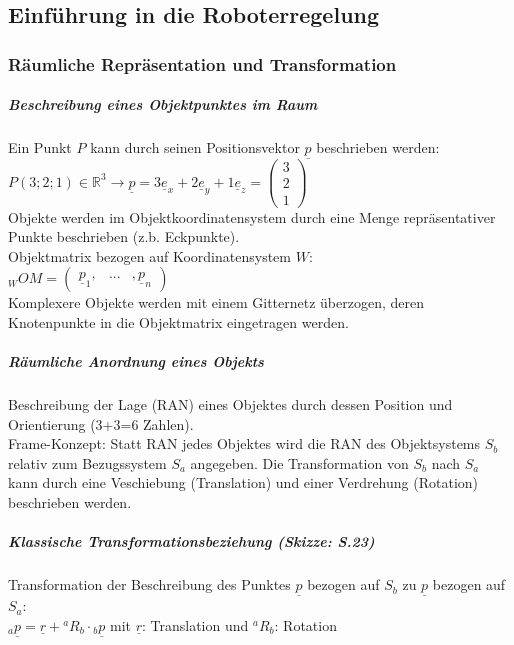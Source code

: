 \documentclass[a4paper,landscape,6pt]{article}
\newcommand{\vect}[1]{\ensuremath{\begin{pmatrix} #1 \end{pmatrix}}}			%
\newcommand{\ul}[1]{\underline{#1}}
\begin{document}
\begin{multicols}{3}
	

\part*{Einführung in die Roboterregelung}
\section{Räumliche Repräsentation und Transformation}
\subsubsection*{Beschreibung eines Objektpunktes im Raum}
Ein Punkt $P$ kann durch seinen Positionsvektor $\ul p$ beschrieben werden:\\
$P(3;2;1) \in \mathbb R^3 \rightarrow \ul p = 3 \ul e_x + 2 \ul e_y + 1 \ul e_z = \vect{3\\2\\1}$ \\
 
Objekte werden im Objektkoordinatensystem durch eine Menge repräsentativer Punkte beschrieben (z.b. Eckpunkte).\\
Objektmatrix bezogen auf Koordinatensystem $W$:\\ ${}_{W}{OM} = \vect{\ul p_1,&...&,\ul p_n}$\\
Komplexere Objekte werden mit einem Gitternetz überzogen, deren Knotenpunkte in die Objektmatrix eingetragen werden.
\subsubsection*{Räumliche Anordnung eines Objekts}
Beschreibung der Lage (RAN) eines Objektes durch dessen Position und Orientierung (3+3=6 Zahlen). \\
\textup{Frame-Konzept}: Statt RAN jedes Objektes wird die RAN des Objektsystems $S_b$ relativ zum Bezugssystem $S_a$ angegeben. Die Transformation von $S_b$ nach $S_a$ kann durch eine Veschiebung (Translation) und einer Verdrehung (Rotation) beschrieben werden.
\subsubsection*{Klassische Transformationsbeziehung \footnotesize{(Skizze: S.23)}}
Transformation der Beschreibung des Punktes $\ul p$ bezogen auf $S_b$ zu $\ul p$ bezogen auf $S_a$:\\
$\boxed{{}_{a}{\ul p} = \ul r + {}^{a}{R}_b \cdot {}_{b}{\ul p}}$ mit $\ul r$: Translation und ${}^{a}{R}_b$: Rotation\\

\end{multicols}
\end{document}
